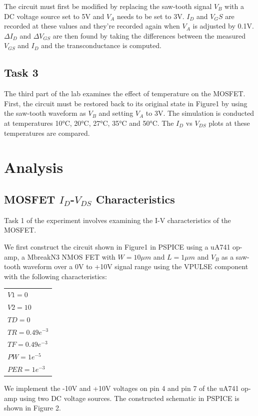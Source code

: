 \documentclass[conference]{IEEEtran}
\begin{document}
The circuit must first be modified by replacing the saw-tooth signal $V_B$ with a DC voltage source set to 5V and $V_A$ needs to be set to 3V. $I_D$ and $V_GS$ are recorded at these values and they’re recorded again when $V_A$ is adjusted by 0.1V. $\Delta I_D$ and $\Delta V_{GS}$ are then found by taking the differences between the measured $V_{GS}$ and $I_D$ and the transconductance is computed.

\subsection{Task 3}
The third part of the lab examines the effect of temperature on the MOSFET. First, the circuit must be restored back to its original state in Figure1 by using the saw-tooth waveform as $V_B$ and setting $V_A$ to 3V. The simulation is conducted at temperatures 10°C, 20°C, 27°C, 35°C and 50°C. The $I_D$ vs $V_{DS}$ plots at these temperatures are compared.

\section{Analysis}

\subsection{MOSFET $I_D$-$V_{DS}$ Characteristics}
Task 1 of the experiment involves examining the I-V characteristics of the MOSFET.

We first construct the circuit shown in Figure1 in PSPICE using a uA741 op-amp, a MbreakN3 NMOS FET with $W = 10\mu m$ and $L = 1 \mu m$ and $V_B$ as a saw-tooth waveform over a 0V to +10V signal range using the VPULSE component with the following characteristics:
\\

\begin{tabular}{l}
    $V1 = 0$\\
    $V2 = 10$\\
    $TD = 0$\\
    $TR = 0.49e^{-3}$\\
    $TF = 0.49e^{-3}$\\
    $PW = 1e^{-5}$\\
    $PER=1e^{-3}$\\
\end{tabular}
\vspace{5mm}

We implement the -10V and +10V voltages on pin 4 and pin 7 of the uA741 op-amp using two DC voltage sources. The constructed schematic in PSPICE is shown in Figure 2.
\end{document}
